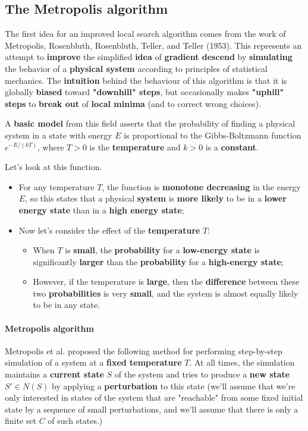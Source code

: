 
\subsection{The Metropolis algorithm}
The first idea for an improved local search algorithm comes from the work of Metropolis, Rosenbluth, Rosenbluth, Teller, and Teller (1953). This represents an attempt to \textbf{improve} the simplified \textbf{idea} of \textbf{gradient descend} by \textbf{simulating} the behavior of a \textbf{physical system} according to principles of statistical mechanics. The \textbf{intuition} behind the behaviour of this algorithm is that it is globally \textbf{biased} toward \textbf{"downhill" steps}, but occasionally makes \textbf{"uphill" steps} to \textbf{break out} of \textbf{local minima} (and to correct wrong choices). 

A \textbf{basic model} from this field asserts that the probability of finding a physical system in a state with energy $E$ is proportional to the Gibbs-Boltzmann function $e^{-E/(kT)}$, where $T > 0$ is the \textbf{temperature} and $k > 0$ is a \textbf{constant}. 

Let’s look at this function. 

\begin{itemize}
    \item For any temperature $T$, the function is \textbf{monotone decreasing} in the energy $E$, so this states that a physical \textbf{system} is \textbf{more likely} to be in a \textbf{lower energy state} than in a \textbf{high energy state};
    \item Now let’s consider the effect of the \textbf{temperature} $T$:
    \begin{itemize}
        \item When $T$ is \textbf{small}, the \textbf{probability} for a \textbf{low-energy state} is significantly \textbf{larger} than the \textbf{probability} for a \textbf{high-energy state};
        \item However, if the temperature is \textbf{large}, then the \textbf{difference} between these two \textbf{probabilities} is very \textbf{small}, and the system is almost equally likely to be in any state.
    \end{itemize} 
\end{itemize}

\paragraph{Metropolis algorithm}
Metropolis et al. proposed the following method for performing step-by-step simulation of a system at a \textbf{fixed temperature} $T$. At all times, the simulation maintains a \textbf{current state} $S$ of the system and tries to produce a \textbf{new state} $S' \in N(S)$ by applying a \textbf{perturbation} to this state (we’ll assume that we’re only interested in states of the system that are "reachable" from some fixed initial state by a sequence of small perturbations, and we’ll assume that there is only a finite set $C$ of such states.)

